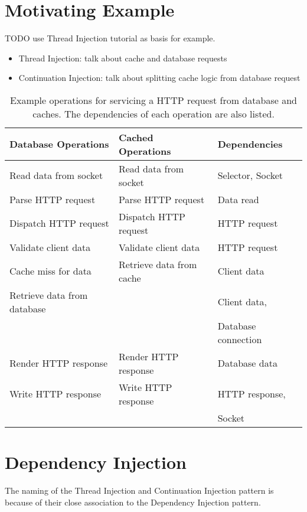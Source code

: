 \documentclass{article}
\begin{document}
\section{Motivating Example}

TODO use Thread Injection tutorial as basis for example.
\begin{itemize}
  \item Thread Injection: talk about cache and database requests
  \item Continuation Injection: talk about splitting cache logic from database request 
\end{itemize}


\begin{table}[!t]
\renewcommand{\arraystretch}{1.3}
\caption{Example operations for servicing a HTTP request from database and caches. The dependencies of each operation are also listed.}
\label{tab:example_request_operations}
\centering
\begin{tabular}{l||l||l}
\hline
\bfseries Database Operations & \bfseries Cached Operations & \bfseries Dependencies \\
\hline\hline
Read data from socket & Read data from socket & Selector, Socket \\
\hline
Parse HTTP request & Parse HTTP request & Data read \\
\hline
Dispatch HTTP request & Dispatch HTTP request & HTTP request \\
\hline
Validate client data & Validate client data & HTTP request \\
\hline
Cache miss for data & Retrieve data from cache & Client data \\
\hline
Retrieve data from database & & Client data, \\
 & & Database connection \\
\hline
Render HTTP response & Render HTTP response & Database data \\
\hline
Write HTTP response & Write HTTP response & HTTP response, \\ 
 & & Socket \\
\hline
\end{tabular}
\end{table}


\section{Dependency Injection}

The naming of the Thread Injection and Continuation Injection pattern is because
of their close association to the Dependency Injection pattern.
\end{document}
